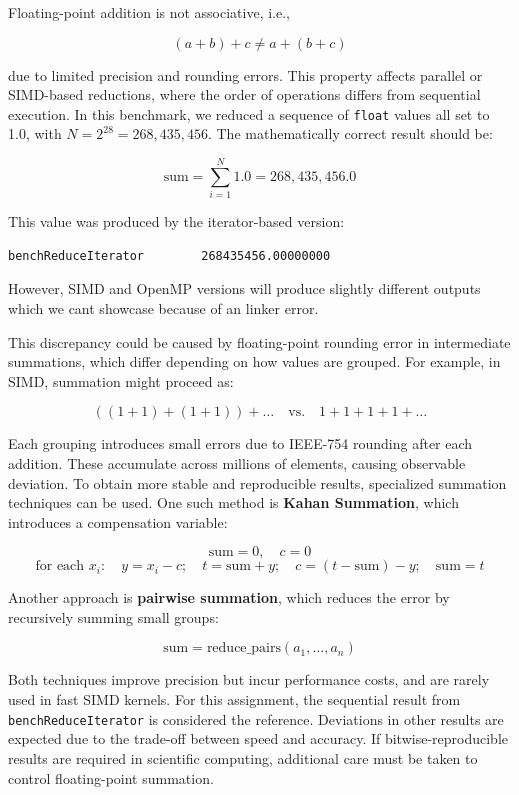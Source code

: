 Floating-point addition is not associative, i.e.,

\[
    (a + b) + c \neq a + (b + c)
\]

due to limited precision and rounding errors.
This property affects parallel or SIMD-based reductions, where the order of operations differs from sequential execution.
In this benchmark, we reduced a sequence of \texttt{float} values all set to 1.0, with \( N = 2^{28} = 268{,}435{,}456 \).
The mathematically correct result should be:

\[
    \text{sum} = \sum_{i=1}^{N} 1.0 = 268{,}435{,}456.0
\]

This value was produced by the iterator-based version:

\begin{verbatim}
benchReduceIterator        268435456.00000000
\end{verbatim}

However, SIMD and OpenMP versions will produce slightly different outputs which we cant showcase because of an linker error.

This discrepancy could be caused by floating-point rounding error in intermediate summations, which differ depending on how values are grouped.
For example, in SIMD, summation might proceed as:

\[
    ((1 + 1) + (1 + 1)) + \ldots
    \quad \text{vs.} \quad
    1 + 1 + 1 + 1 + \ldots
\]

Each grouping introduces small errors due to IEEE-754 rounding after each addition.
These accumulate across millions of elements, causing observable deviation.
To obtain more stable and reproducible results, specialized summation techniques can be used.
One such method is \textbf{Kahan Summation}, which introduces a compensation variable:

\[
    \text{sum} = 0,\quad c = 0
\]
\[
    \text{for each } x_i: \quad y = x_i - c;\quad t = \text{sum} + y;\quad c = (t - \text{sum}) - y;\quad \text{sum} = t
\]

Another approach is \textbf{pairwise summation}, which reduces the error by recursively summing small groups:

\[
    \text{sum} = \text{reduce\_pairs}(a_1, \ldots, a_n)
\]

Both techniques improve precision but incur performance costs, and are rarely used in fast SIMD kernels.
For this assignment, the sequential result from \texttt{benchReduceIterator} is considered the reference.
Deviations in other results are expected due to the trade-off between speed and accuracy.
If bitwise-reproducible results are required in scientific computing, additional care must be taken to control floating-point summation.


